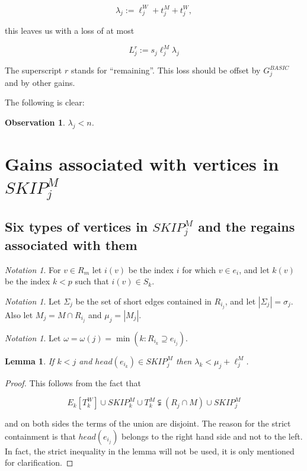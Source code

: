 \documentclass{amsart}
\newtheorem{lemma}[theorem]{Lemma}
\newtheorem{observation}[theorem]{Observation}
\theoremstyle{remark}
\newtheorem{notation}[theorem]{Notation}
\newcommand{\eij}{e_{i_j}}
\newcommand{\rik}{R_{i_k}}
\newcommand{\rij}{R_{i_j}}
\newcommand{\ljm}{{\ell}_{j}^M}
\newcommand{\ljw}{{\ell}_{j}^W}
\newcommand{\tjm}{t^M_j}
\newcommand{\Tkm}{T^M_k}
\newcommand{\tjw}{t^W_j}
\newcommand{\skipjm}{{SKIP}^M_j}
\newcommand{\skipmj}{{SKIP}^M_j}
\newcommand{\skipkm}{{SKIP}^M_k}
\begin{document}
\begin{equation}\label{defoflambdaj} \lambda_j:=\ljw+\tjm+\tjw, \end{equation}




  this leaves us with a loss of at  most

 \begin{equation}\label{lrj} L^r_j:=s_j\ljm\lambda_j \end{equation}

   The superscript $r$ stands for ``remaining''. This loss should be offset by $G^{BASIC}_j$ and by other gains.

The following is clear:

 \begin{observation}\label{lambdalessthann}
$\lambda_j <n$.
\end{observation}










\section{Gains associated with vertices in $SKIP^M_j$}

\subsection{Six types of vertices in $\skipmj$ and the regains associated with them}

\begin{notation}\label{iv}
For $v \in R_m$ let $i(v)$ be the index $i$ for which $v \in e_i$,
and let $k(v)$ be the index $k <p$ such that $i(v) \in S_k$.
\end{notation}


\begin{notation}
Let $\Sigma_j$ be the set of short edges contained in $\rij$, and
let $|\Sigma_j|=\sigma_j$. Also let $M_j=M \cap \rij$ and $\mu_j=|M_j|$.
\end{notation}

\begin{notation}\label{omega}
Let $\omega=\omega(j)=\min(k: \rik \supseteq \eij)$.
\end{notation}

\begin{lemma}\label{lambdasmall}
If $k<j$ and $head(e_{i_k}) \in \skipmj$ then $\lambda_k <
\mu_j+\ell_j^M$.
\end{lemma}
\begin{proof}
This follows from the fact that

$$E_k[T_k^W] \cup \skipkm \cup \Tkm \subsetneqq (R_j \cap M) \cup
\skipjm$$

and on both sides the terms of the union are disjoint. The reason
for the strict containment is that $head(e_{i_j})$ belongs to the
right hand side and not to the left. In fact, the strict inequality
in the lemma will not be used, it is only mentioned for
clarification.
\end{proof}
\end{document}
